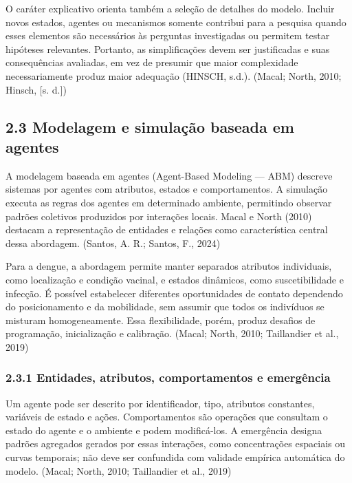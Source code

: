 O caráter explicativo orienta também a seleção de detalhes do modelo.
Incluir novos estados, agentes ou mecanismos somente contribui para a
pesquisa quando esses elementos são necessários às perguntas
investigadas ou permitem testar hipóteses relevantes. Portanto, as
simplificações devem ser justificadas e suas consequências avaliadas, em
vez de presumir que maior complexidade necessariamente produz maior
adequação (HINSCH, s.d.). (Macal; North, 2010; Hinsch, {[}s. d.{]})

\subsection{2.3 Modelagem e simulação baseada em
agentes}\label{modelagem-e-simulauxe7uxe3o-baseada-em-agentes}

A modelagem baseada em agentes (Agent-Based Modeling --- ABM) descreve
sistemas por agentes com atributos, estados e comportamentos. A
simulação executa as regras dos agentes em determinado ambiente,
permitindo observar padrões coletivos produzidos por interações locais.
Macal e North (2010) destacam a representação de entidades e relações
como característica central dessa abordagem. (Santos, A. R.; Santos, F.,
2024)

Para a dengue, a abordagem permite manter separados atributos
individuais, como localização e condição vacinal, e estados dinâmicos,
como suscetibilidade e infecção. É possível estabelecer diferentes
oportunidades de contato dependendo do posicionamento e da mobilidade,
sem assumir que todos os indivíduos se misturam homogeneamente. Essa
flexibilidade, porém, produz desafios de programação, inicialização e
calibração. (Macal; North, 2010; Taillandier et al., 2019)

\subsubsection{2.3.1 Entidades, atributos, comportamentos e
emergência}\label{entidades-atributos-comportamentos-e-emerguxeancia}

Um agente pode ser descrito por identificador, tipo, atributos
constantes, variáveis de estado e ações. Comportamentos são operações
que consultam o estado do agente e o ambiente e podem modificá-los. A
emergência designa padrões agregados gerados por essas interações, como
concentrações espaciais ou curvas temporais; não deve ser confundida com
validade empírica automática do modelo. (Macal; North, 2010; Taillandier
et al., 2019)

